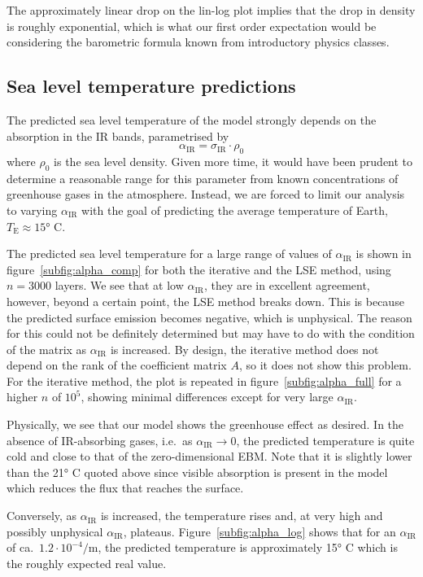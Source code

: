 \documentclass[a4paper,DIV=12,english]{scrartcl}
\begin{document}
The approximately linear drop on the lin-log plot implies that the drop in density is roughly exponential, which is what our first order expectation would be considering the barometric formula known from introductory physics classes.

\subsection{Sea level temperature predictions}
The predicted sea level temperature of the model strongly depends on the absorption in the IR bands, parametrised by 
\begin{equation}
    \alpha_{\text{IR}} = \sigma_\text{IR} \cdot \rho_0
\end{equation}
where $\rho_0$ is the sea level density. Given more time, it would have been prudent to determine a reasonable range for this parameter from known concentrations of greenhouse gases in the atmosphere. Instead, we are forced to limit our analysis to varying $\alpha_{\text{IR}}$ with the goal of predicting the average temperature of Earth, $T_\text{E}\approx 15\text{° C}$.

The predicted sea level temperature for a large range of values of $\alpha_{\text{IR}}$ is shown in figure~\ref{subfig:alpha_comp} for both the iterative and the LSE method, using $n=3000$ layers. We see that at low $\alpha_{\text{IR}}$, they are in excellent agreement, however, beyond a certain point, the LSE method breaks down. This is because the predicted surface emission becomes negative, which is unphysical. The reason for this could not be definitely determined but may have to do with the condition of the matrix as $\alpha_{\text{IR}}$ is increased. By design, the iterative method does not depend on the rank of the coefficient matrix $A$, so it does not show this problem. For the iterative method, the plot is repeated in figure~\ref{subfig:alpha_full} for a higher $n$ of $10^5$, showing minimal differences except for very large $\alpha_{\text{IR}}$.

Physically, we see that our model shows the greenhouse effect as desired. In the absence of IR-absorbing gases, i.e.\ as $\alpha_{\text{IR}}\longrightarrow 0$, the predicted temperature is quite cold and close to that of the zero-dimensional EBM. Note that it is slightly lower than the 21° C quoted above since visible absorption is present in the model which reduces the flux that reaches the surface.

Conversely, as $\alpha_{\text{IR}}$ is increased, the temperature rises and, at very high and possibly unphysical $\alpha_{\text{IR}}$, plateaus. Figure~\ref{subfig:alpha_log} shows that for an $\alpha_{\text{IR}}$ of ca.\ $1.2\cdot 10^{-4}/\text{m}$, the predicted temperature is approximately 15° C which is the roughly expected real value.
\end{document}

